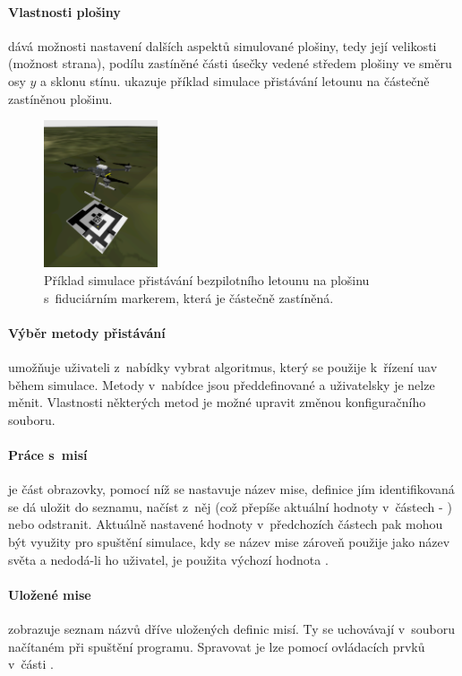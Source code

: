     \paragraph{ Vlastnosti plošiny} dává možnosti nastavení dalších aspektů simulované plošiny, tedy její velikosti (možnost strana), podílu zastíněné části úsečky vedené středem plošiny ve směru osy $y$ a sklonu stínu.  ukazuje příklad simulace přistávání letounu na částečně zastíněnou plošinu.
    \begin{figure}
        \centering
        \includegraphics[width=0.3\textwidth]{img/gui/stin.png}
        \caption[Přistávání na zastíněnou plošinu]{Příklad simulace přistávání bezpilotního letounu na plošinu s~fiduciárním markerem, která je částečně zastíněná.}
        \label{fig:stin}
    \end{figure}

    \paragraph{ Výběr metody přistávání}umožňuje uživateli z~nabídky vybrat algoritmus, který se použije k~řízení \acrshort{uav} během simulace. Metody v~nabídce jsou předdefinované a uživatelsky je nelze měnit. Vlastnosti některých metod je možné upravit změnou konfiguračního souboru.

    \paragraph{ Práce s~misí} je část obrazovky, pomocí níž se nastavuje název mise, definice jím identifikovaná se dá uložit do seznamu, načíst z~něj (což přepíše aktuální hodnoty v~částech  - ) nebo odstranit. Aktuálně nastavené hodnoty v~předchozích částech pak mohou být využity pro spuštění simulace, kdy se název mise zároveň použije jako název světa a nedodá-li ho uživatel, je použita výchozí hodnota .

    \paragraph{ Uložené mise} zobrazuje seznam názvů dříve uložených definic misí. Ty se uchovávají v~souboru načítaném při spuštění programu. Spravovat je lze pomocí ovládacích prvků v~části .
    
